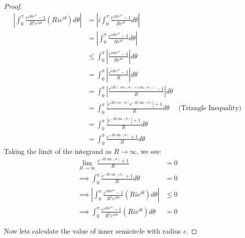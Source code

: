 \documentclass{article}
\newcommand{\abs}[1]{\left\lvert #1\right\rvert}
\begin{document}
\begin{proof}
    \begin{align*}
        \abs{\int_{0}^{\pi} \frac{e^{iRte^{i \theta}} - 1}{R^2e^{2i\theta}}\left(Rie^{i \theta}\right) d \theta}
        &= \abs{i\int_{0}^{\pi} \frac{e^{iRte^{i \theta}} - 1}{Re^{i\theta}} d \theta} \\
        &= \abs{\int_{0}^{\pi} \frac{e^{iRte^{i \theta}} - 1}{Re^{i\theta}} d \theta} \\
        &\leq \int_{0}^{\pi} \abs{\frac{e^{iRte^{i \theta}} - 1}{Re^{i\theta}}} d \theta \\
        &= \int_{0}^{\pi} \abs{\frac{e^{iRte^{i \theta}} - 1}{R}} d \theta \\
        &= \int_{0}^{\pi} \abs{\frac{e^{iRt \left(\cos(\theta) + i \sin(\theta)\right)} - 1}{R}} d \theta \\
        &= \int_{0}^{\pi} \frac{\abs{e^{iRt\cos(\theta)} e^{-Rt \sin(\theta)}} + 1}{R} d \theta & \text{(Triangle Inequality)}\\
        &=  \int_{0}^{\pi} \frac{\abs{e^{-Rt \sin(\theta)}} + 1}{R} d \theta \\
        &=  \int_{0}^{\pi} \frac{e^{-Rt \sin(\theta)} + 1}{R} d \theta
    \end{align*}
    Taking the limit of the integrand as $R \to \infty$, we see: 
    \begin{align*}
        \lim_{R \to \infty} \frac{e^{-Rt \sin(\theta)} + 1}{R} &= 0 \\
        \implies \int_{0}^{\pi} \frac{e^{-Rt \sin(\theta)} + 1}{R} d \theta &= 0 \\
        \implies \abs{\int_{0}^{\pi} \frac{e^{iRte^{i \theta}} - 1}{R^2e^{2i\theta}}\left(Rie^{i \theta}\right) d \theta} & \leq 0 \\
        \implies \int_{0}^{\pi} \frac{e^{iRte^{i \theta}} - 1}{R^2e^{2i\theta}}\left(Rie^{i \theta}\right) d \theta &= 0
    \end{align*} 

    Now lets calculate the value of inner semicircle with radius $\epsilon$.


\end{proof}
\end{document}
